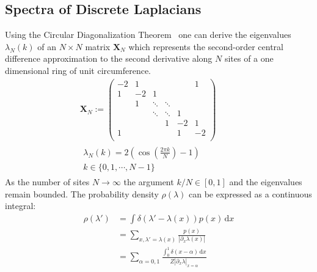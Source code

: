 \documentclass{article}[12pt]
\numberwithin{equation}{section}
\begin{document}
\subsection{Spectra of Discrete Laplacians}
Using the Circular Diagonalization Theorem~\cite{} one can derive the
eigenvalues $\lambda_N(k)$ of an $N\times N$ matrix $\mathbf X_N$ which
represents the second-order central difference approximation to the
second derivative along $N$ sites of a one dimensional ring of unit
circumference.
\begin{align}
  \mathbf X_N :=
  \begin{pmatrix}
    -2 & 1 &  &  &  & 1 \\
    1 & -2 & 1 &  &  &  \\
    & 1 & \ddots & \ddots &  & \\
    & & \ddots & \ddots & 1 & \\
    & & & 1 & -2 & 1 \\
    1 & & & & 1 & -2 \\
  \end{pmatrix}\quad\\
  \begin{matrix}
  \lambda_N(k)=2\left(\cos\left(\frac{2\pi k}{N}\right)-1\right) \\
  k\in\{0,1,\cdots,N-1\}
  \end{matrix}\qquad\qquad
\end{align}
As the number of sites $N\rightarrow\infty$ the argument $k/N\in[0,1]$
and the eigenvalues remain bounded. The probability density $\rho(\lambda)$
can be expressed as a continuous integral:
\begin{align*}
  \rho(\lambda')&=\int\!\delta(\lambda'-\lambda(x))p(x)\,\mathrm{d}x \\
  &=\sum_{x,\lambda'=\lambda(x)}\frac{p(x)}{|\partial_x\lambda(x)|} \\
  &=\sum_{\alpha=0,1}\frac{\int_0^1\!\delta\left(x-\alpha\right)\,\mathrm{d}x}{Z|\partial_x\lambda|_{x=\alpha}}
\end{align*}
\end{document}
